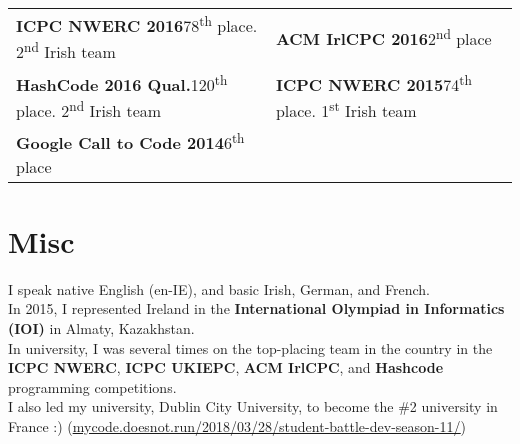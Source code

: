 \documentclass[a4paper, oneside, final]{scrartcl}
\newcommand{\nasc}[2]{\href{#1}{\color{blue}\setulcolor{blue}\ul{#2}}}
\newcommand{\bearna}[0]{\vspace{2.25mm}\\}
\newcommand{\fmtskill}[1]{\textbf{#1}}
\newcommand{\fmtcompetition}[1]{\textbf{\small{#1}}}
\begin{document}
\begin{tabularx}{\columnwidth}{@{}X|X@{}}
\fmtcompetition{ICPC NWERC 2016}\hfill 78\textsuperscript{th} place. 2\textsuperscript{nd} Irish team&
\fmtcompetition{ACM IrlCPC 2016}\hfill 2\textsuperscript{nd} place\\ %
\fmtcompetition{HashCode 2016 Qual.}\hfill 120\textsuperscript{th} place. 2\textsuperscript{nd} Irish team&
\fmtcompetition{ICPC NWERC 2015}\hfill 74\textsuperscript{th} place. 1\textsuperscript{st} Irish team\\ %
\fmtcompetition{Google Call to Code 2014}\hfill 6\textsuperscript{th} place\\%
\end{tabularx}
\fi 
\normalsize{}
\section{Misc}
I speak native English (en-IE), and basic Irish, German, and French.
\bearna
In 2015, I represented Ireland in the \fmtskill{International Olympiad in Informatics (IOI)} in Almaty, Kazakhstan.
\bearna
In university, I was several times on the top-placing team in the country in the \fmtskill{ICPC NWERC}, \fmtskill{ICPC UKIEPC}, \fmtskill{ACM IrlCPC}, and \fmtskill{Hashcode} programming competitions.
\bearna
I also led my university, Dublin City University, to become the \#2 university in France :) (\nasc{https://mycode.doesnot.run/2018/03/28/student-battle-dev-season-11/}{mycode.doesnot.run/2018/03/28/student-battle-dev-season-11/})
\end{document}

